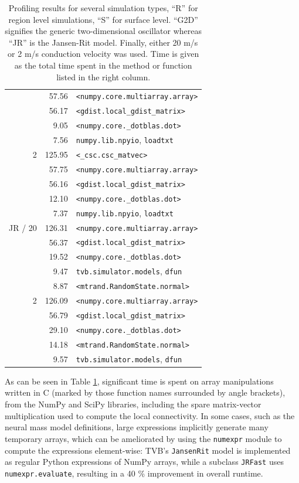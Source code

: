\documentclass{bioinfo}
\begin{document}
\begin{table}
{\begin{tabular}{r | r | l }
	&         57.56& \texttt{<numpy.core.multiarray.array>} \\
	 &         56.17& \texttt{<gdist.local\_gdist\_matrix>} \\
	 &           9.05& \texttt{<numpy.core.\_dotblas.dot>} \\
	 &         7.56& \texttt{numpy.lib.npyio}, \texttt{loadtxt} \\
	\hline
	2 &         125.95& \texttt{<\_csc.csc\_matvec>} \\
	&         57.75& \texttt{<numpy.core.multiarray.array>} \\
	 &         56.16& \texttt{<gdist.local\_gdist\_matrix>} \\
	 &         12.10& \texttt{<numpy.core.\_dotblas.dot>} \\
	 &         7.37& \texttt{numpy.lib.npyio}, \texttt{loadtxt} \\
	\hline
	JR / 20 &         126.31& \texttt{<numpy.core.multiarray.array>} \\
	&         56.37& \texttt{<gdist.local\_gdist\_matrix>} \\
	 &         19.52& \texttt{<numpy.core.\_dotblas.dot>} \\
	 &         9.47& \texttt{tvb.simulator.models}, \texttt{dfun} \\
	 &         8.87& \texttt{<mtrand.RandomState.normal>} \\
	\hline
	2 &         126.09& \texttt{<numpy.core.multiarray.array>} \\
	&         56.79& \texttt{<gdist.local\_gdist\_matrix>} \\
	 &          29.10& \texttt{<numpy.core.\_dotblas.dot>} \\
	 &         14.18& \texttt{<mtrand.RandomState.normal>} \\
	 &         9.57& \texttt{tvb.simulator.models}, \texttt{dfun} \\
	\hline

	\end{tabular}}
	\caption{Profiling results for several simulation types, ``R'' for region 
	level simulations, ``S'' for surface level. ``G2D'' signifies the generic
	two-dimensional oscillator whereas ``JR'' is the Jansen-Rit model. Finally,
	either 20 m/s or 2 m/s conduction velocity was used. Time is given as the
	total time spent in the method or function listed in the right column.}
	\label{tab:profiling}
	\end{table}


As can be seen in Table \ref{tab:profiling},
significant time is spent on array manipulations written in C (marked by those
function names surrounded by angle brackets), from the NumPy and SciPy libraries, 
including the spare matrix-vector multiplication used to compute the local connectivity.
In some cases, such as the 
neural mass model definitions, large expressions implicitly generate many 
temporary arrays, which can be ameliorated by using the \texttt{numexpr} module
to compute the expressions element-wise: TVB's \texttt{JansenRit} model is
implemented as regular Python expressions of NumPy arrays, while a subclass
\texttt{JRFast} uses \texttt{numexpr.evaluate}, resulting in a 40 \% improvement
in overall runtime.
\end{document}
